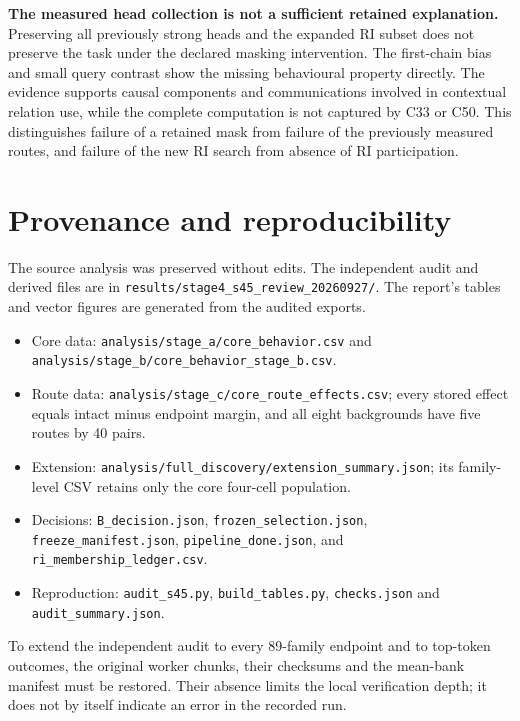 \documentclass[11pt,a4paper]{article}
\newcommand{\file}[1]{\nolinkurl{#1}}
\begin{document}
\textbf{The measured head collection is not a sufficient retained explanation.}
Preserving all previously strong heads and the expanded RI subset does not
preserve the task under the declared masking intervention. The first-chain bias
and small query contrast show the missing behavioural property directly.
The evidence supports causal components and communications involved in contextual
relation use, while the complete computation is not captured by C33 or C50.
This distinguishes failure of a retained mask from failure of the previously
measured routes, and failure of the new RI search from absence of RI participation.

\appendix
\section{Provenance and reproducibility}
The source analysis was preserved without edits. The independent audit and
derived files are in \file{results/stage4_s45_review_20260927/}. The report's
tables and vector figures are generated from the audited exports.
\begin{itemize}
\item Core data: \file{analysis/stage_a/core_behavior.csv} and
\file{analysis/stage_b/core_behavior_stage_b.csv}.
\item Route data: \file{analysis/stage_c/core_route_effects.csv}; every stored
effect equals intact minus endpoint margin, and all eight backgrounds have
five routes by 40 pairs.
\item Extension: \file{analysis/full_discovery/extension_summary.json}; its
family-level CSV retains only the core four-cell population.
\item Decisions: \file{B_decision.json}, \file{frozen_selection.json},
\file{freeze_manifest.json}, \file{pipeline_done.json}, and
\file{ri_membership_ledger.csv}.
\item Reproduction: \file{audit_s45.py}, \file{build_tables.py},
\file{checks.json} and \file{audit_summary.json}.
\end{itemize}
To extend the independent audit to every 89-family endpoint and to top-token
outcomes, the original worker chunks, their checksums and the mean-bank manifest
must be restored. Their absence limits the local verification depth; it does not
by itself indicate an error in the recorded run.
\end{document}
